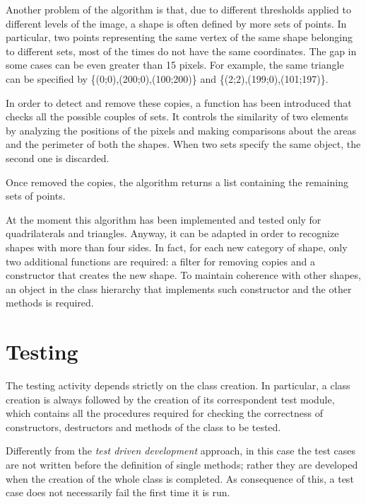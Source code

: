 		
		


		
		
		
		
		Another problem of the algorithm is that, due to different thresholds applied to different levels of the image, a shape is often defined by more sets of points.
		In particular, two points representing the same vertex of the same shape belonging to different sets, most of the times do not have the same coordinates.
		The gap in some cases can be even greater than 15 pixels. 
		For example, the same triangle can be specified by \{(0;0),(200;0),(100;200)\} and \{(2;2),(199;0),(101;197)\}. 
		
		

		In order to detect and remove these copies, a function has been introduced that checks all the possible couples of sets. 
		It controls the similarity of two elements by analyzing the positions of the pixels and making comparisons about the areas and the perimeter of both the shapes. 
		When two sets specify the same object, the second one is discarded. 
		
		Once removed the copies, the algorithm returns a list containing the remaining sets of points.

		At the moment this algorithm has been implemented and tested only for quadrilaterals and triangles. 
		Anyway, it can be adapted in order to recognize shapes with more than four sides.
		In fact, for each new category of shape, only two additional functions are required: a filter for removing copies and a constructor that creates the new shape. 
		To maintain coherence with other shapes, an object in the class hierarchy that implements such constructor and the other methods is required.  
		


	\section{Testing}
	The testing activity depends strictly on the class creation.
	In particular, a class creation is always followed by the creation of its correspondent test module, which contains all the procedures required for checking the correctness of constructors, destructors and methods of the class to be tested.
	
	Differently from the \emph{test driven development} approach, in this case the test cases are not written before the definition of single methods; rather they are developed when the creation of the whole class is completed.
	As consequence of this, a test case does not necessarily fail the first time it is run. 
	
